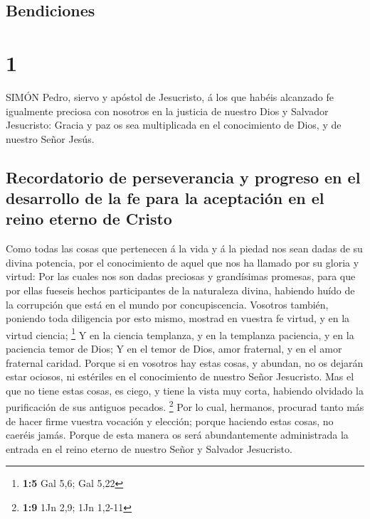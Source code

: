 \hypertarget{bendiciones}{%
\subsection{Bendiciones}\label{bendiciones}}

\hypertarget{section}{%
\section{1}\label{section}}

 SIMÓN Pedro, siervo y apóstol de Jesucristo, á los que
habéis alcanzado fe igualmente preciosa con nosotros en la justicia de
nuestro Dios y Salvador Jesucristo:  Gracia y paz os sea
multiplicada en el conocimiento de Dios, y de nuestro Señor Jesús.

\hypertarget{recordatorio-de-perseverancia-y-progreso-en-el-desarrollo-de-la-fe-para-la-aceptaciuxf3n-en-el-reino-eterno-de-cristo}{%
\subsection{Recordatorio de perseverancia y progreso en el desarrollo de
la fe para la aceptación en el reino eterno de
Cristo}\label{recordatorio-de-perseverancia-y-progreso-en-el-desarrollo-de-la-fe-para-la-aceptaciuxf3n-en-el-reino-eterno-de-cristo}}

 Como todas las cosas que pertenecen á la vida y á la piedad
nos sean dadas de su divina potencia, por el conocimiento de aquel que
nos ha llamado por su gloria y virtud:  Por las cuales nos
son dadas preciosas y grandísimas promesas, para que por ellas fueseis
hechos participantes de la naturaleza divina, habiendo huído de la
corrupción que está en el mundo por concupiscencia. 
Vosotros también, poniendo toda diligencia por esto mismo, mostrad en
vuestra fe virtud, y en la virtud ciencia; \footnote{\textbf{1:5} Gal
  5,6; Gal 5,22}  Y en la ciencia templanza, y en la
templanza paciencia, y en la paciencia temor de Dios;  Y en
el temor de Dios, amor fraternal, y en el amor fraternal caridad.
 Porque si en vosotros hay estas cosas, y abundan, no os
dejarán estar ociosos, ni estériles en el conocimiento de nuestro Señor
Jesucristo.  Mas el que no tiene estas cosas, es ciego, y
tiene la vista muy corta, habiendo olvidado la purificación de sus
antiguos pecados. \footnote{\textbf{1:9} 1Jn 2,9; 1Jn 1,2-11}
 Por lo cual, hermanos, procurad tanto más de hacer firme
vuestra vocación y elección; porque haciendo estas cosas, no caeréis
jamás.  Porque de esta manera os será abundantemente
administrada la entrada en el reino eterno de nuestro Señor y Salvador
Jesucristo.

